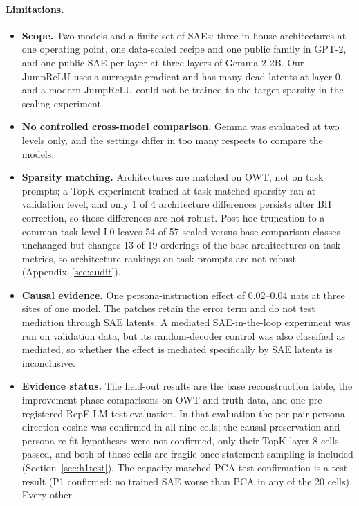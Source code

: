 \paragraph{Limitations.}
\begin{itemize}
  \item \textbf{Scope.} Two models and a finite set of SAEs: three in-house architectures at one operating point, one
        data-scaled recipe and one public family in GPT-2, and one public SAE per layer at three layers of Gemma-2-2B.
        Our JumpReLU uses a surrogate gradient and has many dead latents at layer 0, and a modern JumpReLU could not be
        trained to the target sparsity in the scaling experiment.
  \item \textbf{No controlled cross-model comparison.} Gemma was evaluated at two levels only, and the settings
        differ in too many respects to compare the models.
  \item \textbf{Sparsity matching.} Architectures are matched on OWT, not on task prompts; a TopK experiment trained
        at task-matched sparsity ran at validation level, and only 1 of 4 architecture differences persists after BH
        correction, so those differences are not robust. Post-hoc truncation to a common task-level L0 leaves 54
        of 57 scaled-versus-base comparison classes unchanged but changes 13 of 19 orderings of the base architectures
        on task metrics, so architecture rankings on task prompts are not robust (Appendix~\ref{sec:audit}).
  \item \textbf{Causal evidence.} One persona-instruction effect of 0.02--0.04 nats at three sites of one model. The
        patches retain the error term and do not test mediation through SAE latents. A mediated SAE-in-the-loop
        experiment was run on validation data, but its random-decoder control was also classified as mediated, so
        whether the effect is mediated specifically by SAE latents is inconclusive.
  \item \textbf{Evidence status.} The held-out results are the base reconstruction table, the improvement-phase
        comparisons on OWT and truth data, and one pre-registered RepE-LM test evaluation. In that evaluation the
        per-pair persona direction cosine was confirmed in all nine cells; the causal-preservation and persona re-fit
        hypotheses were not confirmed, only their TopK layer-8 cells passed, and both of those cells are fragile once
        statement sampling is included (Section~\ref{sec:h1test}). The capacity-matched PCA test
        confirmation is a test result (P1 confirmed: no trained SAE worse than PCA in any of the 20 cells). Every other

\end{itemize}
